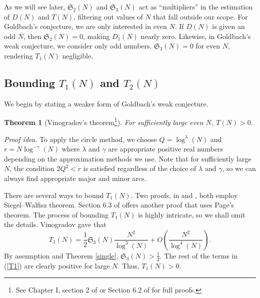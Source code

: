 \documentclass{article}
\newtheorem{theorem}{Theorem}
\begin{document}
As we will see later, $\mathfrak{S}_2(N)$ and $\mathfrak{S}_3(N)$ act as ``multipliers'' in the estimation of $D(N)$ and $T(N)$, filtering out values of $N$ that fall outside our scope. For Goldbach’s conjecture, we are only interested in even $N$. If $D(N)$ is given an odd $N$, then $\mathfrak{S}_2(N) = 0$, making $D_1(N)$ nearly zero. Likewise, in Goldbach’s weak conjecture, we consider only odd numbers. $\mathfrak{S}_3(N) = 0$ for even $N$, rendering $T_1(N)$ negligible.

\subsection{Bounding $T_1(N)$ and $T_2(N)$}
We begin by stating a weaker form of Goldbach's weak conjecture.
\begin{theorem}[Vinogradov's theorem\footnote{See Chapter I, section 2 of \cite{wang} or Section 6.2 of \cite{pan} for full proofs.}]
    For sufficiently large even $N$, $T(N) > 0$.    
\end{theorem}

\noindent \textit{Proof idea.} To apply the circle method, we choose $Q = \log^{\lambda}(N)$ and $r = N\log^{-\gamma}(N)$ where $\lambda$ and $\gamma$ are appropriate positive real numbers depending on the approximation methods we use. Note that for sufficiently large $N$, the condition $2Q^2 < r$ is satisfied regardless of the choice of $\lambda$ and $\gamma$, so we can always find appropriate major and minor arcs.

There are several ways to bound $T_1(N)$. Two proofs, in \cite{wang} and \cite{pan}, both employ Siegel–Walfisz theorem. Section 6.3 of \cite{pan} offers another proof that uses Page's theorem. The process of bounding $T_1(N)$ is highly intricate, so we shall omit the details.
Vinogradov gave that 
\begin{equation}\label{T1}
    T_1(N) = \frac{1}{2} \mathfrak{S}_3(N) \frac{N^2}{\log^3 (N)} + O\left( \frac{N^2}{\log^4 (N)} \right).
\end{equation}
By assumption and Theorem \ref{single}, $\mathfrak{S}_3(N) > \frac{1}{2}$.
The rest of the terms in (\ref{T1}) are clearly positive for large $N$. Thus, $T_1(N) > 0$.
\end{document}
